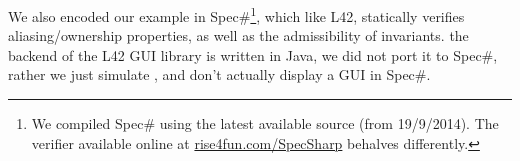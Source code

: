 


We also encoded our example in Spec\#\footnote{We compiled Spec\# using the latest available source (from 19/9/2014). The verifier available online at \url{rise4fun.com/SpecSharp} behalves differently.}, which like L42, statically verifies aliasing/ownership properties, as well as the admissibility of invariants.
 the backend of the L42 GUI library is written in Java, we did not port it to Spec\#, rather we just simulate , and don't actually display a GUI in Spec\#.

